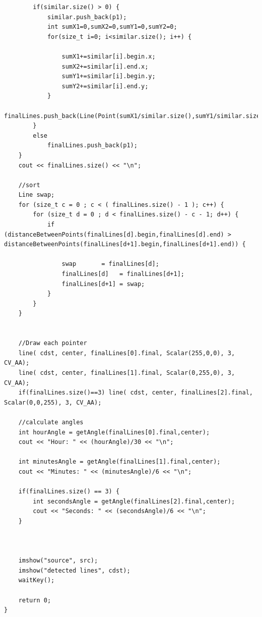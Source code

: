 \documentclass[a4paper]{article}
\begin{document}
\begin{frame}
\begin{lstlisting}
		if(similar.size() > 0) {
			similar.push_back(p1);
			int sumX1=0,sumX2=0,sumY1=0,sumY2=0;
			for(size_t i=0; i<similar.size(); i++) {

				sumX1+=similar[i].begin.x;
				sumX2+=similar[i].end.x;
				sumY1+=similar[i].begin.y;
				sumY2+=similar[i].end.y;
			}
			finalLines.push_back(Line(Point(sumX1/similar.size(),sumY1/similar.size()),Point(sumX2/similar.size(),sumY2/similar.size()),center));
		}
		else
			finalLines.push_back(p1);
	}
	cout << finalLines.size() << "\n";

	//sort
	Line swap;
	for (size_t c = 0 ; c < ( finalLines.size() - 1 ); c++) {
		for (size_t d = 0 ; d < finalLines.size() - c - 1; d++) {
			if (distanceBetweenPoints(finalLines[d].begin,finalLines[d].end) > distanceBetweenPoints(finalLines[d+1].begin,finalLines[d+1].end)) {

				swap       = finalLines[d];
				finalLines[d]   = finalLines[d+1];
				finalLines[d+1] = swap;
			}
		}
	}


	//Draw each pointer
	line( cdst, center, finalLines[0].final, Scalar(255,0,0), 3, CV_AA);
	line( cdst, center, finalLines[1].final, Scalar(0,255,0), 3, CV_AA);
	if(finalLines.size()==3) line( cdst, center, finalLines[2].final, Scalar(0,0,255), 3, CV_AA);

	//calculate angles
	int hourAngle = getAngle(finalLines[0].final,center);
	cout << "Hour: " << (hourAngle)/30 << "\n";

	int minutesAngle = getAngle(finalLines[1].final,center);
	cout << "Minutes: " << (minutesAngle)/6 << "\n";

	if(finalLines.size() == 3) {
		int secondsAngle = getAngle(finalLines[2].final,center);
		cout << "Seconds: " << (secondsAngle)/6 << "\n";
	}



	imshow("source", src);
	imshow("detected lines", cdst);
	waitKey();

	return 0;
}

\end{lstlisting}
\end{frame}
\end{document}
